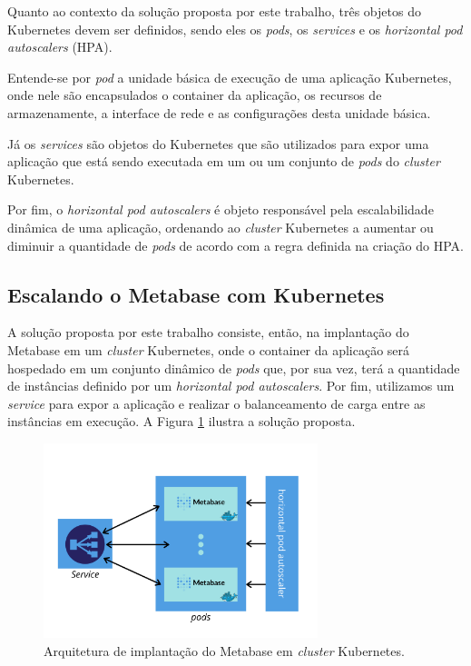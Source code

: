 Quanto ao contexto da solução proposta por este trabalho, três objetos do Kubernetes devem ser definidos, sendo eles os \textit{pods}, os \textit{services} e os \textit{horizontal pod autoscalers} (HPA). 

Entende-se por \textit{pod} a unidade básica de execução de uma aplicação Kubernetes, onde nele são encapsulados o container da aplicação, os recursos de armazenamente, a interface de rede e as configurações desta unidade básica. 

Já os \textit{services} são objetos do Kubernetes que são utilizados para expor uma aplicação que está sendo executada em um ou um conjunto de \textit{pods} do \textit{cluster} Kubernetes.

Por fim, o \textit{horizontal pod autoscalers} é objeto responsável pela escalabilidade dinâmica de uma aplicação, ordenando ao \textit{cluster} Kubernetes a aumentar ou diminuir a quantidade de \textit{pods} de acordo com a regra definida na criação do HPA.

\subsection{Escalando o Metabase com Kubernetes}

A solução proposta por este trabalho consiste, então, na implantação do Metabase em um \textit{cluster} Kubernetes, onde o container da aplicação será hospedado em um conjunto dinâmico de \textit{pods} que, por sua vez, terá a quantidade de instâncias definido por um \textit{horizontal pod autoscalers}. Por fim, utilizamos um \textit{service} para expor a aplicação e realizar o balanceamento de carga entre as instâncias em execução. A Figura \ref{fig.metabase-k8s} ilustra a solução proposta.

\begin{figure}[htp]
   \centering
    \includegraphics[width=8cm]{Imagens/Metabase-on-k8s}
    \caption{Arquitetura de implantação do Metabase em \textit{cluster} Kubernetes.}
    \label{fig.metabase-k8s}
\end{figure} 


